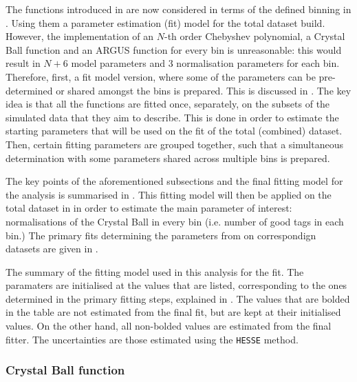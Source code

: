 The functions introduced in  are now considered in terms of the defined binning in .
Using them a \Mbc parameter estimation (fit) model for the total dataset build.
However, the implementation of an $N$-th order Chebyshev polynomial, a Crystal Ball function and an ARGUS function for every \EB bin is unreasonable:
this would result in $N+6$ model parameters and 3 normalisation parameters for each bin.
Therefore, first, a fit model version, where some of the parameters can be pre-determined or shared amongst the bins is prepared.
This is discussed in .
The key idea is that all the functions are fitted once, separately, on the subsets of the simulated data that they aim to describe.
This is done in order to estimate the starting parameters that will be used on the fit of the total (combined) dataset.
Then, certain fitting parameters are grouped together, such that a simultaneous determination with some parameters shared across multiple bins is prepared.

The key points of the aforementioned subsections and the final fitting model for the analysis is summarised in .
This fitting model will then be applied on the total dataset in  in order to estimate the main parameter of interest: normalisations of the Crystal Ball in every \EB bin (i.e. number of good tags in each \EB bin.)
The primary \Mbc fits determining the parameters from  on correspondign datasets are given in . 

\begin{table}[htbp!]
    \centering
    \caption{\label{tab:fitting_init_params} The summary of the fitting model used in this analysis for the \Mbc fit.
    The paramaters are initialised at the values that are listed, corresponding to the ones determined in the primary fitting steps, explained in .
    The values that are bolded in the table are not estimated from the final \Mbc fit, but are kept at their initialised values.
    On the other hand, all non-bolded values are estimated from the final fitter.
    The uncertainties are those estimated using the \texttt{HESSE} method.
    }

\end{table}

\subsubsection{Crystal Ball function}\label{sec:crystal_ball_prefit}

